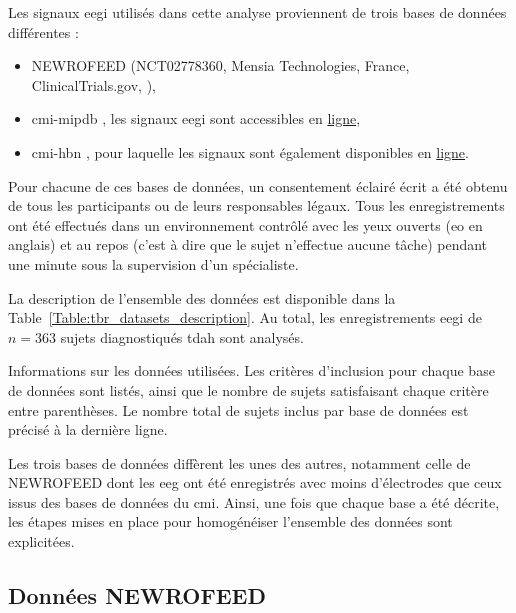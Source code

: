 Les signaux \gls{eegi} utilisés dans cette analyse proviennent de trois bases de données différentes :
\begin{itemize}
\item NEWROFEED (NCT02778360, Mensia Technologies, France, ClinicalTrials.gov, \citet{Bioulac2019}),
\item \gls{cmi-mipdb} \citep{Langer2017, Langer2017b}, les signaux \gls{eegi} sont accessibles en \href{http://fcon_1000.projects.nitrc.org/indi/cmi_eeg/eeg.html}{ligne},
\item \gls{cmi-hbn} \citep{Alexander2017, Alexander2017b}, pour laquelle les signaux sont également disponibles en 
\href{http://fcon_1000.projects.nitrc.org/indi/cmi_healthy_brain_network/sharing_neuro.html}{ligne}.
\end{itemize}
Pour chacune de ces bases de données, un consentement éclairé écrit a été obtenu de tous les participants ou de leurs responsables légaux. Tous les enregistrements
ont été effectués dans un environnement contrôlé avec les yeux ouverts (\gls{eo} en anglais) et au repos (c'est à dire que le sujet n'effectue aucune tâche) 
pendant une minute sous la supervision d'un spécialiste. 

La description de l'ensemble des données est disponible dans la Table~\ref{Table:tbr_datasets_description}. Au total, les enregistrements \gls{eegi} de 
$n = 363$ sujets diagnostiqués \gls{tdah} sont analysés.

\begin{table}[h!]
  \centering
  \caption[Informations sur les données utilisées.]{Informations sur les données utilisées. Les critères d'inclusion pour chaque base de données sont listés, ainsi que le nombre de sujets satisfaisant
	chaque critère entre parenthèses. Le nombre total de sujets inclus par base de données est précisé à la dernière ligne.}
  
  \label{Table:tbr_datasets_description}
\end{table}

Les trois bases de données diffèrent les unes des autres, notamment celle de NEWROFEED dont les \gls{eeg} ont été enregistrés avec moins d'électrodes 
que ceux issus des bases de données du \gls{cmi}. Ainsi, une fois que chaque base a été décrite, les étapes
mises en place pour homogénéiser l'ensemble des données sont explicitées.

\subsection{Données NEWROFEED}

